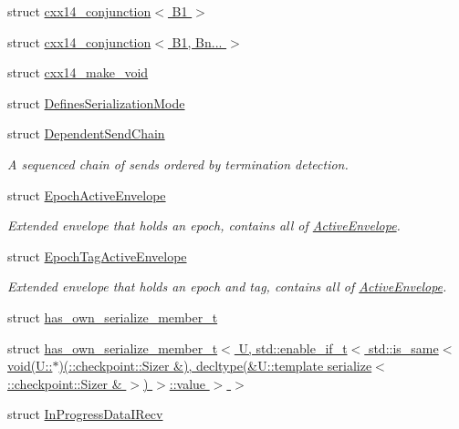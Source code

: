 \begin{DoxyCompactItemize}
struct \hyperlink{structvt_1_1messaging_1_1cxx14__conjunction_3_01_b1_01_4}{cxx14\+\_\+conjunction$<$ B1 $>$}
\item 
struct \hyperlink{structvt_1_1messaging_1_1cxx14__conjunction_3_01_b1_00_01_bn_8_8_8_01_4}{cxx14\+\_\+conjunction$<$ B1, Bn... $>$}
\item 
struct \hyperlink{structvt_1_1messaging_1_1cxx14__make__void}{cxx14\+\_\+make\+\_\+void}
\item 
struct \hyperlink{structvt_1_1messaging_1_1_defines_serialization_mode}{Defines\+Serialization\+Mode}
\item 
struct \hyperlink{classvt_1_1messaging_1_1_dependent_send_chain}{Dependent\+Send\+Chain}
\begin{DoxyCompactList}\small\item\em A sequenced chain of sends ordered by termination detection. \end{DoxyCompactList}\item 
struct \hyperlink{structvt_1_1messaging_1_1_epoch_active_envelope}{Epoch\+Active\+Envelope}
\begin{DoxyCompactList}\small\item\em Extended envelope that holds an epoch, contains all of {\ttfamily \hyperlink{structvt_1_1messaging_1_1_active_envelope}{Active\+Envelope}}. \end{DoxyCompactList}\item 
struct \hyperlink{structvt_1_1messaging_1_1_epoch_tag_active_envelope}{Epoch\+Tag\+Active\+Envelope}
\begin{DoxyCompactList}\small\item\em Extended envelope that holds an epoch and tag, contains all of {\ttfamily \hyperlink{structvt_1_1messaging_1_1_active_envelope}{Active\+Envelope}}. \end{DoxyCompactList}\item 
struct \hyperlink{structvt_1_1messaging_1_1has__own__serialize__member__t}{has\+\_\+own\+\_\+serialize\+\_\+member\+\_\+t}
\item 
struct \hyperlink{structvt_1_1messaging_1_1has__own__serialize__member__t_3_01_u_00_01std_1_1enable__if__t_3_01std429d4c0886e02358959789109e87ad22}{has\+\_\+own\+\_\+serialize\+\_\+member\+\_\+t$<$ U, std\+::enable\+\_\+if\+\_\+t$<$ std\+::is\+\_\+same$<$ void(\+U\+::$\ast$)(\+::checkpoint\+::\+Sizer \&), decltype(\&\+U\+::template serialize$<$\+::checkpoint\+::\+Sizer \& $>$) $>$\+::value $>$ $>$}
\item 
struct \hyperlink{structvt_1_1messaging_1_1_in_progress_data_i_recv}{In\+Progress\+Data\+I\+Recv}

\end{DoxyCompactItemize}

